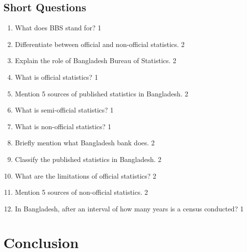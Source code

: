 \documentclass[a4paper,oneside]{book}
\begin{document}
\begin{enumerate}
\begin{enumerate}
 \end{enumerate}
 
 
 \section{Short Questions}
 \begin{enumerate}

    \item What does BBS stand for?  \hfill 1
    \item Differentiate between official and non-official statistics. \hfill 2
    \item Explain the role of Bangladesh Bureau of Statistics. \hfill 2
    \item What is official statistics?  \hfill 1
    \item Mention 5 sources of published statistics in Bangladesh. \hfill 2
    \item What is semi-official statistics?  \hfill 1
    \item What is non-official statistics?  \hfill 1
    \item Briefly mention what Bangladesh bank does.  \hfill 2
    \item Classify the published statistics in Bangladesh. \hfill 2
    \item What are the limitations of official statistics? \hfill 2
    \item Mention 5 sources of non-official statistics. \hfill 2
    \item In Bangladesh, after an interval of how many years is a census 
    conducted?  \hfill 1
    
    \end{enumerate}

\backmatter
\chapter{Conclusion}
\lipsum[8]



\tableofcontents
\end{document}
